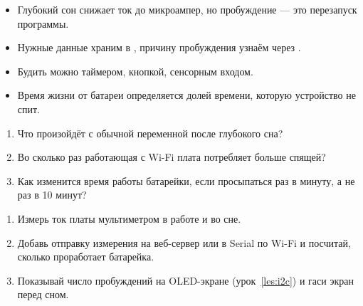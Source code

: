 
\begin{summary}
\begin{itemize}[leftmargin=*]
  \item Глубокий сон снижает ток до микроампер, но пробуждение --- это перезапуск программы.
  \item Нужные данные храним в , причину пробуждения узнаём через .
  \item Будить можно таймером, кнопкой, сенсорным входом.
  \item Время жизни от батареи определяется долей времени, которую устройство не спит.
\end{itemize}
\end{summary}

\begin{quiz}
\begin{enumerate}
  \item Что произойдёт с обычной переменной после глубокого сна?
  \item Во сколько раз работающая с Wi-Fi плата потребляет больше спящей?
  \item Как изменится время работы батарейки, если просыпаться раз в минуту, а не раз в 10 минут?
\end{enumerate}
\end{quiz}

\begin{tasks}
\begin{enumerate}
  \item Измерь ток платы мультиметром в работе и во сне.
  \item Добавь отправку измерения на веб-сервер или в Serial по Wi-Fi и посчитай, сколько проработает батарейка.
  \item Показывай число пробуждений на OLED-экране (урок~\ref{les:i2c}) и гаси экран перед сном.
\end{enumerate}
\end{tasks}
